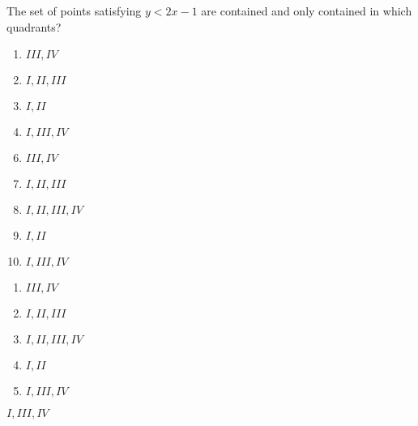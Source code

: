 


 The set of points satisfying $y<2x-1$ are contained and only contained in which quadrants?


\ifsat
	\begin{enumerate}[label=\Alph*)]
		\item   $III, IV$ 
		\item  $I, II, III$
		\item  $I,II$
		\item  $I, III, IV$%
	\end{enumerate}
\else
\fi

\ifacteven
	\begin{enumerate}[label=\textbf{\Alph*.},itemsep=\fill,align=left]
		\setcounter{enumii}{5}
		\item   $III, IV$ 
		\item  $I, II, III$
		\item  $I, II, III, IV$
		\addtocounter{enumii}{1}
		\item  $I,II$
		\item  $I, III, IV$%
	\end{enumerate}
\else
\fi

\ifactodd
	\begin{enumerate}[label=\textbf{\Alph*.},itemsep=\fill,align=left]
		\item   $III, IV$ 
		\item  $I, II, III$
		\item  $I, II, III, IV$
		\item  $I,II$
		\item  $I, III, IV$%
	\end{enumerate}
\else
\fi

\ifgridin
  $I, III, IV$%

\else
\fi

